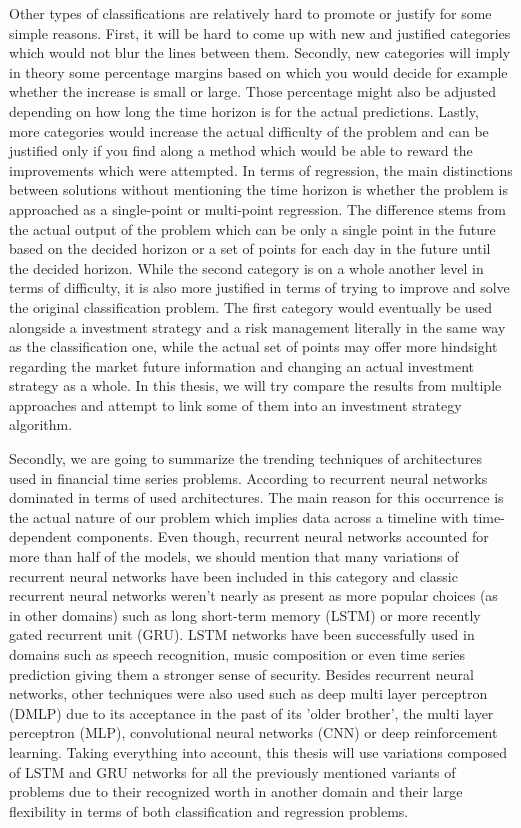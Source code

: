 Other types of classifications are relatively hard to promote or justify for some simple reasons. First, it will be hard to come up with new and justified categories which would not blur the lines between them. Secondly, new categories will imply in theory some percentage margins based on which you would decide for example whether the increase is small or large. Those percentage might also be adjusted depending on how long the time horizon is for the actual predictions. Lastly, more categories would increase the actual difficulty of the problem and can be justified only if you find along a method which would be able to reward the improvements which were attempted. In terms of regression, the main distinctions between solutions without mentioning the time horizon is whether the problem is approached as a single-point or multi-point regression. The difference stems from the actual output of the problem which can be only a single point in the future based on the decided horizon or a set of points for each day in the future until the decided horizon. While the second category is on a whole another level in terms of difficulty, it is also more justified in terms of trying to improve and solve the original classification problem. The first category would eventually be used alongside a investment strategy and a risk management literally in the same way as the classification one, while the actual set of points may offer more hindsight regarding the market future information and changing an actual investment strategy as a whole. In this thesis, we will try compare the results from multiple approaches and attempt to link some of them into an investment strategy algorithm.

\vspace{5mm}

Secondly, we are going to summarize the trending techniques of architectures used in financial time series problems. According to \cite{sezer2020financial} recurrent neural networks dominated in terms of used architectures. The main reason for this occurrence is the actual nature of our problem which implies data across a timeline with time-dependent components. Even though, recurrent neural networks accounted for more than half of the models, we should mention that many variations of recurrent neural networks have been included in this category and classic recurrent neural networks weren't nearly as present as more popular choices (as in other domains) such as long short-term memory (LSTM) or more recently gated recurrent unit (GRU). LSTM networks have been successfully used in domains such as speech recognition, music composition or even time series prediction giving them a stronger sense of security. Besides recurrent neural networks, other techniques were also used such as deep multi layer perceptron (DMLP) due to its acceptance in the past of its 'older brother', the multi layer perceptron (MLP), convolutional neural networks (CNN) or deep reinforcement learning. Taking everything into account, this thesis will use variations composed of LSTM and GRU networks for all the previously mentioned variants of problems due to their recognized worth in another domain and their large flexibility in terms of both classification and regression problems.

